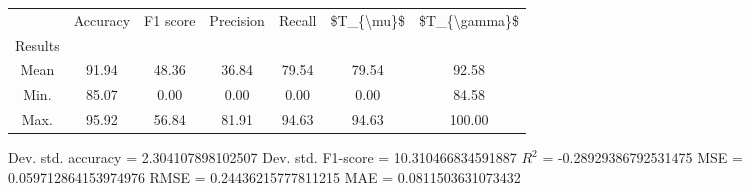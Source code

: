 \begin{tabular}{|c|c|c|c|c|c|c|}
\toprule
{} &  Accuracy &  F1 score &  Precision &  Recall &  \$T\_\{\textbackslash mu\}\$ &  \$T\_\{\textbackslash gamma\}\$ \\
Results &           &           &            &         &            &               \\
\hline
Mean    &     91.94 &     48.36 &      36.84 &   79.54 &      79.54 &         92.58 \\
Min.    &     85.07 &      0.00 &       0.00 &    0.00 &       0.00 &         84.58 \\
Max.    &     95.92 &     56.84 &      81.91 &   94.63 &      94.63 &        100.00 \\
\bottomrule
\end{tabular}

 Dev. std. accuracy = 2.304107898102507
 Dev. std. F1-score = 10.310466834591887
 $R^2$ = -0.28929386792531475
 MSE = 0.059712864153974976
 RMSE = 0.24436215777811215
 MAE = 0.0811503631073432